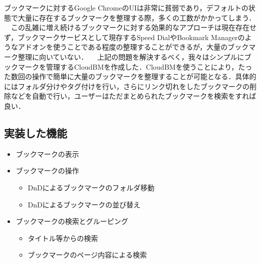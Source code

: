 ブックマークに対するGoogle ChromeのUIは非常に貧弱であり，デフォルトの状態で大量に存在するブックマークを整理する際，多くの工数がかかってしまう．
　この乱雑に増え続けるブックマークに対する効果的なアプローチは現在存在せず，ブックマークサービスとして現存するSpeed DialやBookmark Managerのようなアドオンを使うことである程度の整理することができるが，大量のブックマーク整理に向いていない．
　上記の問題を解決するべく，我々はシンプルにブックマークを管理するCloudBMを作成した．CloudBMを使うことにより，たった数回の操作で簡単に大量のブックマークを整理することが可能となる．具体的にはフォルダ分けやタグ付けを行い，さらにリンク切れをしたブックマークの削除などを自動で行い，ユーザーはただまとめられたブックマークを検索をすれば良い．
\subsection{実装した機能}
\begin{itemize}
\item ブックマークの表示
\item ブックマークの操作
\begin{itemize}
\item DnDによるブックマークのフォルダ移動
\item DnDによるブックマークの並び替え
\end{itemize}
\item ブックマークの検索とグルーピング
\begin{itemize}
\item タイトル等からの検索
\item ブックマークのページ内容による検索
\end{itemize}
\end{itemize}


